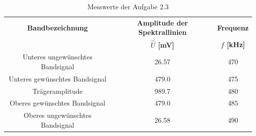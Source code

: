 \documentclass[12pt]{scrartcl}
\begin{document}
\begin{table}[!h] 
    \centering
    \begin{tabular}{|c|c|c|} 
          \hline \textbf{Bandbezeichnung}   & \textbf{Amplitude der Spektrallinien} & \textbf{Frequenz} \\ 
                                            & \textbf{$\hat{U}$ [mV]}               & \textbf{ $f$ [kHz]} \\ \hline
            Unteres ungewünschtes Bandsignal& 26.57 &  470    \\ \hline
            Unteres gewünschtes Bandsignal  & 479.0 &  475    \\ \hline
            Trägeramplitude                 & 989.7 &  480    \\ \hline
            Oberes gewünschtes Bandsignal   & 479.0 &  485    \\ \hline
            Oberes ungewünschtes Bandsignal & 26.58 &  490    \\ \hline
    \end{tabular}
    \caption{Messwerte der Aufgabe 2.3} \label{tab:Aufgabe2.3}
\end{table}
\newpage
\end{document}
